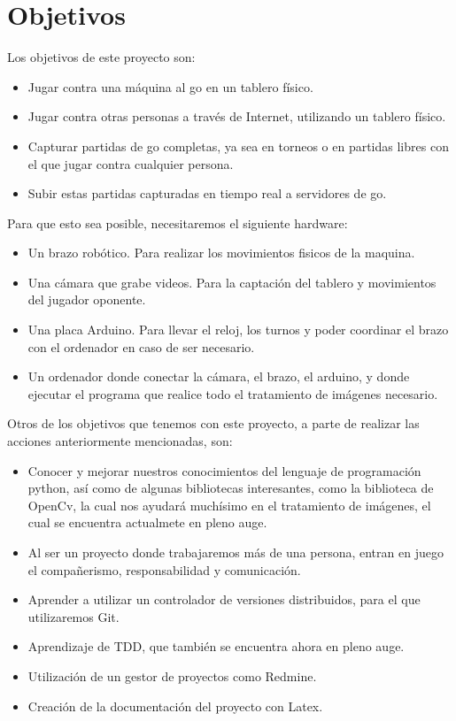 \documentclass[12pt,a4papert,woside,openright,titlepage,final]{book}
\begin{document}
\section{Objetivos} 

Los objetivos de este proyecto son: 

\begin{itemize}
    \item Jugar contra una máquina al go en un tablero físico. 
    \item Jugar contra otras personas a través de Internet, utilizando un
    tablero físico. 
    \item Capturar partidas de go completas, ya sea en torneos o en partidas
    libres con el que jugar contra cualquier persona. 
    \item Subir estas partidas capturadas en tiempo real a servidores de go. 
\end{itemize}

Para que esto sea posible, necesitaremos el siguiente hardware:

\begin{itemize}
    \item Un brazo robótico. Para realizar los movimientos fisicos de la maquina.
    \item Una cámara que grabe videos. Para la captación del tablero y
    movimientos del jugador oponente.
    \item Una placa Arduino. Para llevar el reloj, los turnos y poder coordinar
    el brazo con el ordenador en caso de ser necesario. 
    \item Un ordenador donde conectar la cámara, el brazo, el arduino, y donde
    ejecutar el programa que realice todo el tratamiento de imágenes necesario.
\end{itemize}

Otros de los objetivos que tenemos con este proyecto, a parte de realizar las
acciones anteriormente mencionadas, son:

\begin{itemize}
    \item Conocer y mejorar nuestros conocimientos del lenguaje de programación
    python, así como de algunas bibliotecas interesantes, como la biblioteca de
    OpenCv, la cual nos ayudará muchísimo en el tratamiento de imágenes, el cual
    se encuentra actualmete en pleno auge.
    \item Al ser un proyecto donde trabajaremos más de una persona, entran en
    juego el compañerismo, responsabilidad y comunicación.
    \item Aprender a utilizar un controlador de versiones distribuidos, para el
    que utilizaremos Git.
    \item Aprendizaje de TDD, que también se encuentra ahora en pleno auge.
    \item Utilización de un gestor de proyectos como Redmine.
    \item Creación de la documentación del proyecto con Latex.
\end{itemize}
\end{document}
